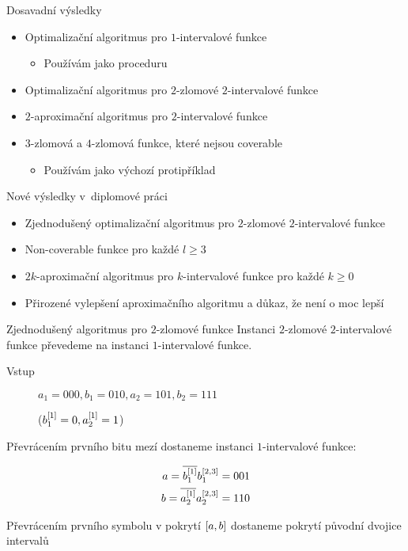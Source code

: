 \documentclass{beamer}
\theoremstyle{remark}
\begin{document}
\begin{frame}{Dosavadní výsledky}
\begin{itemize}
\item
Optimalizační algoritmus pro $1$-intervalové funkce \citep{Schieber2005154}
\begin{itemize}
\item Používám jako proceduru
\end{itemize}

\item
Optimalizační algoritmus pro $2$-zlomové $2$-intervalové funkce \citep{Dubovsky2012}

\item
$2$-aproximační algoritmus pro $2$-intervalové funkce \citep{Dubovsky2012}

\item $3$-zlomová a $4$-zlomová funkce,
které nejsou coverable \citep{Dubovsky2012}
\begin{itemize}
\item Používám jako výchozí protipříklad
\end{itemize}
\end{itemize}
\end{frame}

\begin{frame}{Nové výsledky v~diplomové práci}
\begin{itemize}
\item Zjednodušený optimalizační algoritmus pro $2$-zlomové $2$-intervalové funkce
\item Non-coverable funkce pro každé $l \geq 3$
\item $2k$-aproximační algoritmus pro $k$-intervalové funkce pro každé $k \geq 0$
\item Přirozené vylepšení aproximačního algoritmu a důkaz, že není o moc lepší
\end{itemize}
\end{frame}

\begin{frame}{Zjednodušený algoritmus pro $2$-zlomové funkce}
Instanci $2$-zlomové $2$-intervalové funkce převedeme na instanci $1$-intervalové funkce.


\begin{example}
\begin{description}
\item[Vstup]
$a_1 = 000, b_1 = 010, a_2 = 101, b_2 = 111$

($b_1^{[1]} = 0, a_2^{[1]} = 1$)
\end{description}

Převrácením prvního bitu mezí dostaneme instanci $1$-intervalové funkce:

\begin{align*}
a = \overline{b_1^{[1]}} b_1^{[2, 3]} = 001 \\
b = \overline{a_2^{[1]}} a_2^{[2, 3]} = 110
\end{align*}

Převrácením prvního symbolu v pokrytí $[a, b]$ dostaneme pokrytí původní dvojice intervalů
\end{example}

\end{frame}
\end{document}
